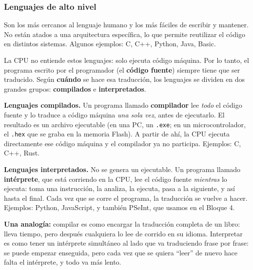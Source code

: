 \subsubsection{Lenguajes de alto nivel}

Son los más cercanos al lenguaje humano y los más fáciles de escribir y mantener. No están atados a una arquitectura específica, lo que permite reutilizar el código en distintos sistemas. Algunos ejemplos: C, C++, Python, Java, Basic.

La CPU no entiende estos lenguajes: solo ejecuta código máquina. Por lo tanto, el programa escrito por el programador (el \textbf{código fuente}) siempre tiene que ser traducido. Según \textbf{cuándo} se hace esa traducción, los lenguajes se dividen en dos grandes grupos: \textbf{compilados} e \textbf{interpretados}.

\textbf{Lenguajes compilados.} Un programa llamado \textbf{compilador} lee \emph{todo} el código fuente y lo traduce a código máquina \emph{una sola vez}, antes de ejecutarlo. El resultado es un archivo ejecutable (en una PC, un \texttt{.exe}; en un microcontrolador, el \texttt{.hex} que se graba en la memoria Flash). A partir de ahí, la CPU ejecuta directamente ese código máquina y el compilador ya no participa. Ejemplos: C, C++, Rust.

\textbf{Lenguajes interpretados.} No se genera un ejecutable. Un programa llamado \textbf{intérprete}, que está corriendo en la CPU, lee el código fuente \emph{mientras} lo ejecuta: toma una instrucción, la analiza, la ejecuta, pasa a la siguiente, y así hasta el final. Cada vez que se corre el programa, la traducción se vuelve a hacer. Ejemplos: Python, JavaScript, y también PSeInt, que usamos en el Bloque 4.

\begin{notabox}
\textbf{Una analogía:} compilar es como encargar la traducción completa de un libro: lleva tiempo, pero después cualquiera lo lee de corrido en su idioma. Interpretar es como tener un intérprete simultáneo al lado que va traduciendo frase por frase: se puede empezar enseguida, pero cada vez que se quiera ``leer'' de nuevo hace falta el intérprete, y todo va más lento.
\end{notabox}


